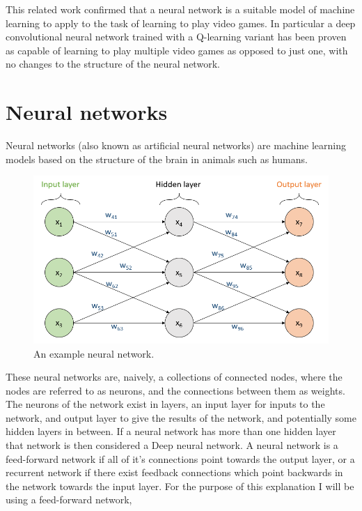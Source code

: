 \documentclass[10pt]{article}
\begin{document}
		This related work confirmed that a neural network is a suitable model of machine learning to apply to the task of learning to play video games. In particular a deep convolutional neural network trained with a Q-learning variant has been proven as capable of learning to play multiple video games as opposed to just one, with no changes to the structure of the neural network.\\
		
	\bigskip
	
	\section{Neural networks}
		Neural networks (also known as artificial neural networks) are machine learning models based on the structure of the brain in animals such as humans.\\
		
		\begin{figure}[h]			
			\includegraphics[scale=0.5]{img/network}
			\centering
			\caption{An example neural network.}
			\label{nnetwork}
		\end{figure}	
		
		These neural networks are, naively, a collections of connected nodes, where the nodes are referred to as neurons, and the connections between them as weights. The neurons of the network exist in layers, an input layer for inputs to the network, and output layer to give the results of the network, and potentially some hidden layers in between. If a neural network has more than one hidden layer that network is then considered a Deep neural network. A neural network is a feed-forward network if all of it's connections point towards the output layer, or a recurrent network if there exist feedback connections which point backwards in the network towards the input layer. For the purpose of this explanation I will be using a feed-forward network,\\
		
\end{document}
